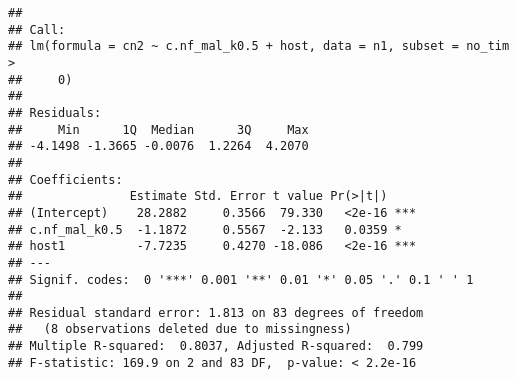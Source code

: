 \documentclass[]{article}
\newenvironment{Shaded}{\begin{snugshade}}{\end{snugshade}}
\newcommand{\KeywordTok}[1]{\textcolor[rgb]{0.13,0.29,0.53}{\textbf{#1}}}
\newcommand{\DataTypeTok}[1]{\textcolor[rgb]{0.13,0.29,0.53}{#1}}
\newcommand{\DecValTok}[1]{\textcolor[rgb]{0.00,0.00,0.81}{#1}}
\newcommand{\StringTok}[1]{\textcolor[rgb]{0.31,0.60,0.02}{#1}}
\newcommand{\CommentTok}[1]{\textcolor[rgb]{0.56,0.35,0.01}{\textit{#1}}}
\newcommand{\OperatorTok}[1]{\textcolor[rgb]{0.81,0.36,0.00}{\textbf{#1}}}
\newcommand{\NormalTok}[1]{#1}
\begin{document}
\begin{verbatim}
## 
## Call:
## lm(formula = cn2 ~ c.nf_mal_k0.5 + host, data = n1, subset = no_tim > 
##     0)
## 
## Residuals:
##     Min      1Q  Median      3Q     Max 
## -4.1498 -1.3665 -0.0076  1.2264  4.2070 
## 
## Coefficients:
##               Estimate Std. Error t value Pr(>|t|)    
## (Intercept)    28.2882     0.3566  79.330   <2e-16 ***
## c.nf_mal_k0.5  -1.1872     0.5567  -2.133   0.0359 *  
## host1          -7.7235     0.4270 -18.086   <2e-16 ***
## ---
## Signif. codes:  0 '***' 0.001 '**' 0.01 '*' 0.05 '.' 0.1 ' ' 1
## 
## Residual standard error: 1.813 on 83 degrees of freedom
##   (8 observations deleted due to missingness)
## Multiple R-squared:  0.8037, Adjusted R-squared:  0.799 
## F-statistic: 169.9 on 2 and 83 DF,  p-value: < 2.2e-16
\end{verbatim}

\begin{Shaded}
\end{Shaded}
\end{document}
